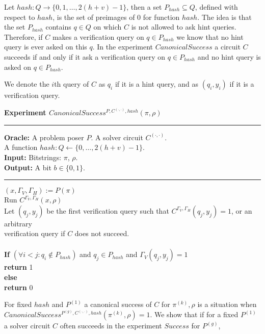 
Let $hash:Q\rightarrow\{0,1,\dots, 2(h+v)-1\}$, then a set $P_{hash} \subseteq Q$,
defined with respect to $hash$, is the set of preimages of $0$ for function $hash$.
The idea is that the set $P_{hash}$ contains $q \in Q$ on which $C$ is not allowed to ask hint queries.
Therefore, if $C$ makes a verification query on $q \in P_{hash}$ we know that no hint query is ever asked on this $q$.
In the experiment $CanonicalSuccess$ a circuit $C$ succeeds if and only if it ask a verification query on $q \in P_{hash}$
and no hint query is asked on $q \in P_{hash}$.

We denote the $i$th query of $C$ as $q_i$ if it is a hint query, and as $(q_i, y_i)$ if it is a verification query.
%
\begin{codeblock}
  \textbf{Experiment $CanonicalSuccess^{P, C^{(\cdot, \cdot)}, hash}(\pi, \rho)$}
  \medskip

  \hrule

  \medskip
  \textbf{Oracle:} A problem poser $P$. A solver circuit $C^{(\cdot, \cdot)}$.\\
  \IndII A function $hash: Q \leftarrow \{0, \dots, 2(h+v) - 1\}$.\\
  \textbf{Input:}  Bitstrings: $\pi$, $\rho$. \\
  \textbf{Output:} A bit $b \in \{0,1\}$.

  \medskip\hrule\medskip
  $(x, \Gamma_V, \Gamma_H) := P(\pi)$\\
  Run $C^{\Gamma_V, \Gamma_H} (x, \rho)$ \\
  \IndI Let $(q_j,y_j)$ be the first verification query such that $C^{\Gamma_V, \Gamma_H}(q_j, y_j) = 1$, or an arbitrary\\ \IndI
  verification query if $C$ does not succeed.\\
  \\
  \textbf{If} $(\forall i < j :  q_i \notin P_{hash} )$ and $q_j \in P_{hash}$ and $\Gamma_V(q_j, y_j) = 1$ \\
  \IndI \textbf{return} 1\\
  \textbf{else}\\
  \IndI \textbf{return} 0
\end{codeblock}
%
For fixed $hash$ and $P^{(1)}$ a canonical success of $C$ for $\pi^{(k )}, \rho$ is a situation when \\ $CanonicalSuccess^{P^{(g)}, C^{(\cdot, \cdot)}, hash}(\pi^{(k)}, \rho) = 1$.
We show that if for a fixed $P^{(1)}$ a solver circuit $C$ often succeeds in the experiment $Success$ for $P^{(g)}$,
